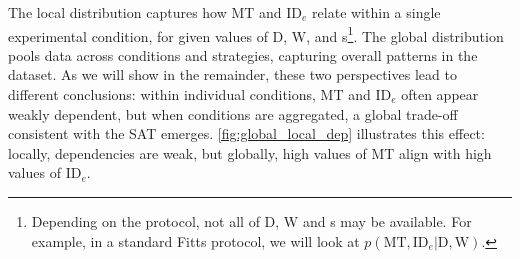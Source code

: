 \documentclass[acmlarge, manuscript,review]{acmart}
\newcommand{\mt}{\ensuremath{{\text{MT}}}\xspace}
\newcommand{\ide}{\ensuremath{{\text{ID}_e}}\xspace}
\newcommand{\D}{\ensuremath{{\text{D}}}\xspace}
\newcommand{\W}{\ensuremath{{\text{W}}}\xspace}
\begin{document}
The local distribution captures how MT and \ide relate within a single experimental condition, for given values of D, W, and s\footnote{Depending on the protocol, not all of D, W and s may be available. For example, in a standard Fitts protocol, we will look at $p(\mt, \ide | \D, \W)$.}. 
The global distribution pools data across conditions and strategies, capturing overall patterns in the dataset. 
As we will show in the remainder, these two perspectives lead to different conclusions: within individual conditions, MT and \ide often appear weakly dependent, but when conditions are aggregated, a global trade-off consistent with the SAT emerges. 
\autoref{fig:global_local_dep} illustrates this effect: locally, dependencies are weak, but globally, high values of MT align with high values of \ide. 
\end{document}
